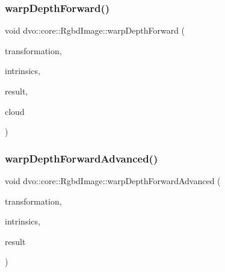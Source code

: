 \subsubsection{\texorpdfstring{warp\+Depth\+Forward()}{warpDepthForward()}}
{\footnotesize\ttfamily void dvo\+::core\+::\+Rgbd\+Image\+::warp\+Depth\+Forward (\begin{DoxyParamCaption}\item[{const \mbox{\hyperlink{namespacedvo_1_1core_af89a8f837f3ae51ed196b7988e59e53d}{Affine\+Transform}} \&}]{transformation,  }\item[{const \mbox{\hyperlink{structdvo_1_1core_1_1_intrinsic_matrix}{Intrinsic\+Matrix}} \&}]{intrinsics,  }\item[{\mbox{\hyperlink{structdvo_1_1core_1_1_rgbd_image}{Rgbd\+Image}} \&}]{result,  }\item[{cv\+::\+Mat\+\_\+$<$ cv\+::\+Vec3d $>$ \&}]{cloud }\end{DoxyParamCaption})}

\mbox{\label{structdvo_1_1core_1_1_rgbd_image_acc3ee946610da287f2c5680bdc41cf07}} 
\subsubsection{\texorpdfstring{warp\+Depth\+Forward\+Advanced()}{warpDepthForwardAdvanced()}}
{\footnotesize\ttfamily void dvo\+::core\+::\+Rgbd\+Image\+::warp\+Depth\+Forward\+Advanced (\begin{DoxyParamCaption}\item[{const \mbox{\hyperlink{namespacedvo_1_1core_af89a8f837f3ae51ed196b7988e59e53d}{Affine\+Transform}} \&}]{transformation,  }\item[{const \mbox{\hyperlink{structdvo_1_1core_1_1_intrinsic_matrix}{Intrinsic\+Matrix}} \&}]{intrinsics,  }\item[{\mbox{\hyperlink{structdvo_1_1core_1_1_rgbd_image}{Rgbd\+Image}} \&}]{result }\end{DoxyParamCaption})}

\mbox{\label{structdvo_1_1core_1_1_rgbd_image_a9f476f47d4970842c7e9f96f6ad1c7a3}} 
